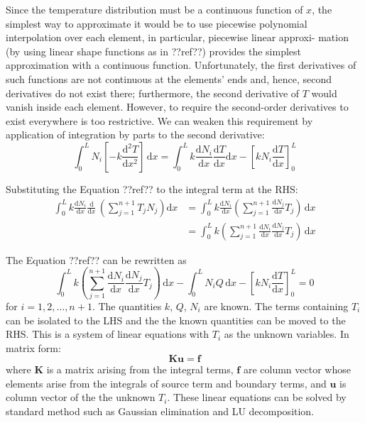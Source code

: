 \documentclass[a4paper,12pt]{article} %
\begin{document}
Since the temperature distribution must be a continuous function of $x$,
the simplest way to approximate it would be to use piecewise polynomial
interpolation over each element, in particular, piecewise linear approxi-
mation (by using linear shape functions as in ??ref??)
provides the simplest approximation with a continuous function.
Unfortunately, the first derivatives of such functions are not continuous
at the elements' ends and, hence, second derivatives do not exist there;
furthermore, the second derivative of $T$ would vanish inside each element.
However, to require the second-order derivatives to exist everywhere is
too restrictive.
We can weaken this requirement by application of integration by parts to
the second derivative:
\begin{equation}
\int_{0}^{L} N_{i} \left[ -k\frac{\mathrm{d}^2 T}{\mathrm{d}x^2} \right]\,\mathrm{d}x =
\int_{0}^{L} k \frac{\mathrm{d} N_{i}}{\mathrm{d}x}
\frac{\mathrm{d} T}{\mathrm{d}x} \mathrm{d}x -
\left[ k N_{i} \frac{\mathrm{d}T}{\mathrm{d}x} \right]_{0}^{L}
\end{equation}

Substituting the Equation ??ref?? to the integral term at the RHS:
\begin{align}
\int_{0}^{L} k \frac{\mathrm{d} N_{i}}{\mathrm{d}x}
\frac{\mathrm{d}}{\mathrm{d}x}\, \left( \sum_{j=1}^{n+1} T_{j} N_{j} \right) \mathrm{d}x & =
\int_{0}^{L} k \frac{\mathrm{d} N_{i}}{\mathrm{d}x}
\left( \sum_{j=1}^{n+1} \frac{\mathrm{d}N_{j}}{\mathrm{d}x} T_{j} \right)\, \mathrm{d}x \\
& = \int_{0}^{L} k
\left( \sum_{j=1}^{n+1}
\frac{\mathrm{d} N_{i}}{\mathrm{d}x}
\frac{\mathrm{d}N_{j}}{\mathrm{d}x} T_{j} \right)\, \mathrm{d}x
\end{align}

The Equation ??ref?? can be rewritten as
\begin{equation}
\int_{0}^{L} k
\left( \sum_{j=1}^{n+1}
\frac{\mathrm{d} N_{i}}{\mathrm{d}x}
\frac{\mathrm{d}N_{j}}{\mathrm{d}x} T_{j} \right)\, \mathrm{d}x -
\int_{0}^{L} N_{i} Q\, \mathrm{d}x -
\left[ k N_{i} \frac{\mathrm{d}T}{\mathrm{d}x} \right]_{0}^{L} = 0
\end{equation}
for $i=1,2,\ldots,n+1$. The quantities $k$, $Q$, $N_{i}$ are known.
The terms containing $T_{i}$ can be isolated to the LHS and the
the known quantities can be moved to the RHS. This is a system
of linear equations with $T_{i}$ as the unknown variables. In matrix form:
\begin{equation}
\mathbf{K} \mathbf{u} = \mathbf{f}
\end{equation}
where $\mathbf{K}$ is a matrix arising from the integral terms, $\mathbf{f}$ are
column vector whose elements arise from
the integrals of source term and boundary terms,
and $\mathbf{u}$ is column vector of the the unknown $T_{i}$.
These linear equations
can be solved by standard method such as Gaussian elimination and LU decomposition.
\end{document}
